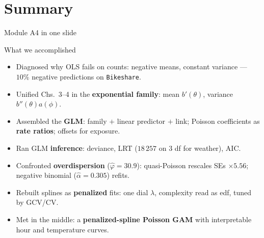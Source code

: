 \documentclass[aspectratio=169,11pt]{beamer}
\begin{document}
\section{Summary}

\begin{frame}{Module A4 in one slide}
  \begin{block}{What we accomplished}
    \begin{itemize}
      \item Diagnosed why OLS fails on counts: negative means, constant variance ---
            $10\%$ negative predictions on \texttt{Bikeshare}.
      \item Unified Chs.\ 3--4 in the \textbf{exponential family}: mean $b'(\theta)$,
            variance $b''(\theta) a(\phi)$.
      \item Assembled the \textbf{GLM}: family $+$ linear predictor $+$ link; Poisson
            coefficients as \textbf{rate ratios}; offsets for exposure.
      \item Ran GLM \textbf{inference}: deviance, LRT ($18\,257$ on $3$ df for weather),
            AIC.
      \item Confronted \textbf{overdispersion} ($\hat\varphi = 30.9$): quasi-Poisson
            rescales SEs $\times 5.56$; negative binomial ($\hat\alpha = 0.305$) refits.
      \item Rebuilt splines as \textbf{penalized} fits: one dial $\lambda$, complexity
            read as edf, tuned by GCV/CV.
      \item Met in the middle: a \textbf{penalized-spline Poisson GAM} with
            interpretable hour and temperature curves.
    \end{itemize}
  \end{block}
\end{frame}
\end{document}
